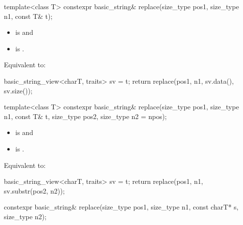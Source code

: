 %
\begin{itemdecl}
template<class T>
  constexpr basic_string& replace(size_type pos1, size_type n1, const T& t);
\end{itemdecl}

\begin{itemdescr}
\pnum
\constraints
\begin{itemize}
\item
{} is
 and
\item
{} is
.
\end{itemize}

\pnum
\effects
Equivalent to:
\begin{codeblock}
basic_string_view<charT, traits> sv = t;
return replace(pos1, n1, sv.data(), sv.size());
\end{codeblock}
\end{itemdescr}

%
\begin{itemdecl}
template<class T>
  constexpr basic_string& replace(size_type pos1, size_type n1, const T& t,
                                  size_type pos2, size_type n2 = npos);
\end{itemdecl}

\begin{itemdescr}
\pnum
\constraints
\begin{itemize}
\item
{} is
 and
\item
{} is
.
\end{itemize}

\pnum
\effects
Equivalent to:
\begin{codeblock}
basic_string_view<charT, traits> sv = t;
return replace(pos1, n1, sv.substr(pos2, n2));
\end{codeblock}
\end{itemdescr}

%
\begin{itemdecl}
constexpr basic_string& replace(size_type pos1, size_type n1, const charT* s, size_type n2);
\end{itemdecl}

